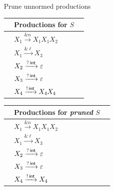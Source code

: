 \documentclass[10pt]{beamer}
\begin{document}
\begin{frame} {Prune unnormed productions}
	\vspace*{-2mm}
	\hspace*{5mm}\begin{tabular}{l l l }
 		&Productions for $S$&  \\ \hline
 	 	&$X_1 \xrightarrow{\& n} X_1 X_1 X_2$ &\\
 	 	&$X_1 \xrightarrow{\& \ell} X_3$ &\\
 	 	&$X_2 \xrightarrow{?\, \mathsf{int}} \varepsilon$&\\
 	 	&$X_3 \xrightarrow{?\, \mathsf{int}} \varepsilon $&\\
 	 	&$X_4 \xrightarrow{!\, \mathsf{int}} X_4 X_4$ &\\
	\end{tabular}
	\hspace*{1cm} \pause
	\begin{tabular}{l l l }
 		&Productions for \emph{pruned} $S$&  \\ \hline
  		&\hspace*{4mm}$X_1 \xrightarrow{\& n} X_1 X_1 X_2$ & \\
  		&\hspace*{4mm}$X_1 \xrightarrow{\& \ell} X_3$ &\\
 		&\hspace*{4mm}$X_2 \xrightarrow{?\, \mathsf{int}} \varepsilon$&\\
  		&\hspace*{4mm}$X_3 \xrightarrow{?\, \mathsf{int}} \varepsilon $&\\
  		&\hspace*{4mm}$X_4 \xrightarrow{!\, \mathsf{int}} X_4$ &\\
	\end{tabular}
 	\vspace*{2mm}
\end{frame}
\end{document}
